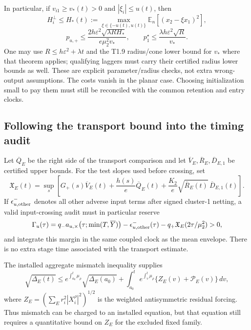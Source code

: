 \documentclass{article} %
\theoremstyle{plain}
\theoremstyle{definition}
\theoremstyle{remark}
\begin{document}
In particular, if $v_{i1}\ge v_*(t)>0$ and $|\xi_i|\le u(t)$, then
\[
 H_i^\perp\le H_*(t):=
 \max_{\xi\in\{-u(t),u(t)\}}\mathbb E_n[(x_2-\xi x_1)^2],
\]
\[
 p_{u,+}\le\frac{2h\varepsilon^2\sqrt{\lambda R H_*}}
                       {e\mu_2^2v_*},\qquad
 p_1^\star\le\frac{\lambda h\varepsilon^2\sqrt R}{v_*}.
\]
One may use $R\le h\varepsilon^2+\lambda t$ and the T1.9 radius/cone
lower bound for $v_*$ where that theorem applies; qualifying laggers must
carry their certified radius lower bounds as well. These are explicit
parameter/radius checks, not extra wrong-output assumptions. The costs
vanish in the planar case. Choosing initialization small to pay them must
still be reconciled with the common retention and entry clocks.

\subsection{Following the transport bound into the timing audit}

Let $\overline Q_E$ be the right side of the transport comparison and let
$\overline V_E,\overline R_E,\overline D_{E,1}$ be certified upper bounds.
For the test slopes used before crossing, set
\[
 \mathfrak X_E(t)=\sup_s\left[
 G_+(s)\overline V_E(t)+\frac{h(s)}e\overline Q_E(t)
       +\frac{K_2}e\sqrt{\overline R_E(t)}\,\overline D_{E,1}(t)
 \right].
\]
If $\epsilon_{u,\rm other}^-$ denotes all other adverse input terms after
signed cluster-1 netting, a valid input-crossing audit must in particular
reserve
\begin{equation}\label{sbflux:crossing-budget}
 \Gamma_u(\tau)=q_-a_{u,\times}
 \bigl(\tau;\min(T,\overline Y)\bigr)
 -\epsilon_{u,\rm other}^-(\tau)
 -q_+\mathfrak X_E(2\tau/\mu_2^2)>0,
\end{equation}
and integrate this margin in the same coupled clock as the mean envelope.
There is no extra stage time associated with the transport estimate.

The installed aggregate mismatch inequality supplies
\[
 \sqrt{\Delta_E(t)}\le
 e^{\int_{a_0}^t\mu_\rho}\sqrt{\Delta_E(a_0)}
 +\int_{a_0}^t e^{\int_v^t\mu_\rho}
     \{Z_E(v)+\mathcal P_E(v)\}\,dv,
\]
where $Z_E=(\sum_E r_i^2|X_i^\rho|^2)^{1/2}$ is the weighted
antisymmetric residual forcing. Thus mismatch can be charged to an
installed equation, but that equation still requires a quantitative
bound on $Z_E$ for the excluded fixed family.
\end{document}
